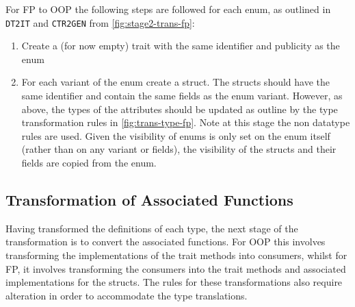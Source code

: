 \documentclass[ oneside,%
                    author={James Elgar},
                    degree={MEng},
                     title={Bidirectional transformer between functional and \\ object-oriented programming in Rust},
                  subtitle={}]{dissertation}
\begin{document}
For FP to OOP the following steps are followed for each enum, as outlined in \verb|DT2IT| and \verb|CTR2GEN| from \autoref{fig:stage2-trans-fp}:
\begin{enumerate}
    \item Create a (for now empty) trait with the same identifier and publicity as the enum  
    \item For each variant of the enum create a struct. The structs should have the same identifier and contain the same fields as the enum variant.
    However, as above, the types of the attributes should be updated as outline by the type transformation rules in \autoref{fig:trans-type-fp}. Note at this stage the non datatype rules are used.
    Given the visibility of enums is only set on the enum itself (rather than on any variant or fields), the visibility of the structs and their fields are copied from the enum.
\end{enumerate}

\subsection{Transformation of Associated Functions}

Having transformed the definitions of each type, the next stage of the transformation is to convert the associated functions. For OOP this involves transforming the implementations of the trait methods into consumers, whilst for FP, it involves transforming the consumers into the trait methods and associated implementations for the structs. The rules for these transformations also require alteration in order to accommodate the type translations.

\end{document}
